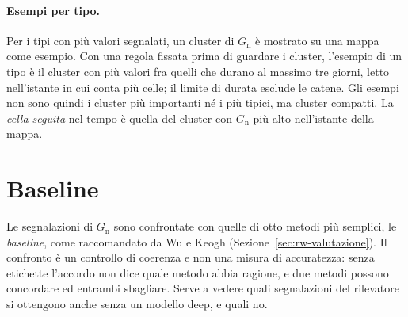 \paragraph{Esempi per tipo.} Per i tipi con più valori segnalati, un cluster di $G_{\mathrm{n}}$ è mostrato su una mappa come esempio. Con una regola fissata prima di guardare i cluster, l'esempio di un tipo è il cluster con più valori fra quelli che durano al massimo tre giorni, letto nell'istante in cui conta più celle; il limite di durata esclude le catene. Gli esempi non sono quindi i cluster più importanti né i più tipici, ma cluster compatti. La \emph{cella seguita} nel tempo è quella del cluster con $G_{\mathrm{n}}$ più alto nell'istante della mappa.

\section{Baseline}
\label{sec:exp-baseline}

Le segnalazioni di $G_{\mathrm{n}}$ sono confrontate con quelle di otto metodi più semplici, le \emph{baseline}, come raccomandato da Wu e Keogh (Sezione~\ref{sec:rw-valutazione}). Il confronto è un controllo di coerenza e non una misura di accuratezza: senza etichette l'accordo non dice quale metodo abbia ragione, e due metodi possono concordare ed entrambi sbagliare. Serve a vedere quali segnalazioni del rilevatore si ottengono anche senza un modello deep, e quali no.

